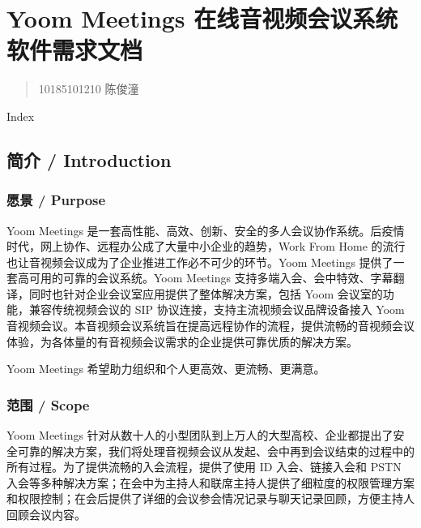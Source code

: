 \documentclass[]{ctexart}
\date{}
\begin{document}
\hypertarget{yoom-meetings-ux5728ux7ebfux97f3ux89c6ux9891ux4f1aux8baeux7cfbux7edf-ux8f6fux4ef6ux9700ux6c42ux6587ux6863}{%
\section{Yoom Meetings 在线音视频会议系统
软件需求文档}\label{yoom-meetings-ux5728ux7ebfux97f3ux89c6ux9891ux4f1aux8baeux7cfbux7edf-ux8f6fux4ef6ux9700ux6c42ux6587ux6863}}

\begin{quote}
10185101210 陈俊潼
\end{quote}

Index

\tableofcontents

\hypertarget{ux7b80ux4ecb--introduction}{%
\subsection{简介 / Introduction}\label{ux7b80ux4ecb--introduction}}

\hypertarget{ux613fux666f--purpose}{%
\subsubsection{愿景 / Purpose}\label{ux613fux666f--purpose}}

Yoom Meetings
是一套高性能、高效、创新、安全的多人会议协作系统。后疫情时代，网上协作、远程办公成了大量中小企业的趋势，Work
From Home 的流行也让音视频会议成为了企业推进工作必不可少的环节。Yoom
Meetings 提供了一套高可用的可靠的会议系统。Yoom Meetings
支持多端入会、会中特效、字幕翻译，同时也针对企业会议室应用提供了整体解决方案，包括
Yoom 会议室的功能，兼容传统视频会议的 SIP
协议连接，支持主流视频会议品牌设备接入 Yoom
音视频会议。本音视频会议系统旨在提高远程协作的流程，提供流畅的音视频会议体验，为各体量的有音视频会议需求的企业提供可靠优质的解决方案。

Yoom Meetings 希望助力组织和个人更高效、更流畅、更满意。

\hypertarget{ux8303ux56f4--scope}{%
\subsubsection{范围 / Scope}\label{ux8303ux56f4--scope}}

Yoom Meetings
针对从数十人的小型团队到上万人的大型高校、企业都提出了安全可靠的解决方案，我们将处理音视频会议从发起、会中再到会议结束的过程中的所有过程。为了提供流畅的入会流程，提供了使用
ID 入会、链接入会和 PSTN
入会等多种解决方案；在会中为主持人和联席主持人提供了细粒度的权限管理方案和权限控制；在会后提供了详细的会议参会情况记录与聊天记录回顾，方便主持人回顾会议内容。
\end{document}
